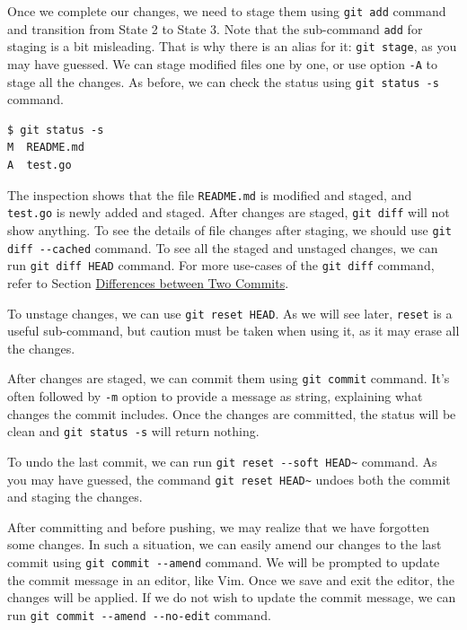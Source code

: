 \documentclass[11pt]{article}
\begin{document}
Once we complete our changes, we need to stage them using \texttt{git add} command and transition from State 2 to State 3. Note that the sub-command \texttt{add} for staging is a bit misleading. That is why there is an alias for it: \texttt{git stage}, as you may have guessed. We can stage modified files one by one, or use option \texttt{-A} to stage all the changes. As before, we can check the status using \texttt{git status -s} command.
\begin{verbatim}
$ git status -s
M  README.md
A  test.go
\end{verbatim}
The inspection shows that the file \texttt{README.md} is modified and staged, and \texttt{test.go} is newly added and staged. After changes are staged, \texttt{git diff} will not show anything. To see the details of file changes after staging, we should use \texttt{git diff -{}-cached} command. To see all the staged and unstaged changes, we can run \texttt{git diff HEAD} command. For more use-cases of the \texttt{git diff} command, refer to Section \hyperref[orgtarget2]{Differences between Two Commits}.

To unstage changes, we can use \texttt{git reset HEAD}. As we will see later, \texttt{reset} is a useful sub-command, but caution must be taken when using it, as it may erase all the changes.

After changes are staged, we can commit them using \texttt{git commit} command. It's often followed by \texttt{-m} option to provide a message as string, explaining what changes the commit includes. Once the changes are committed, the status will be clean and \texttt{git status -s} will return nothing.

To undo the last commit, we can run \texttt{git reset -{}-soft HEAD\textasciitilde{}} command. As you may have guessed, the command \texttt{git reset HEAD\textasciitilde{}} undoes both the commit and staging the changes.

After committing and before pushing, we may realize that we have forgotten some changes. In such a situation, we can easily amend our changes to the last commit using \texttt{git commit -{}-amend} command. We will be prompted to update the commit message in an editor, like Vim. Once we save and exit the editor, the changes will be applied. If we do not wish to update the commit message, we can run \texttt{git commit -{}-amend -{}-no-edit} command.
\end{document}

